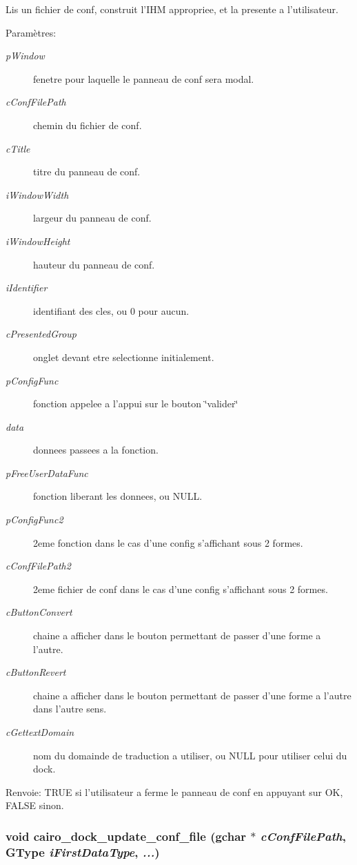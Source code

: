Lis un fichier de conf, construit l'IHM appropriee, et la presente a l'utilisateur. \begin{Desc}
\item[Paramètres:]
\begin{description}
\item[{\em pWindow}]fenetre pour laquelle le panneau de conf sera modal. \item[{\em cConfFilePath}]chemin du fichier de conf. \item[{\em cTitle}]titre du panneau de conf. \item[{\em iWindowWidth}]largeur du panneau de conf. \item[{\em iWindowHeight}]hauteur du panneau de conf. \item[{\em iIdentifier}]identifiant des cles, ou 0 pour aucun. \item[{\em cPresentedGroup}]onglet devant etre selectionne initialement. \item[{\em pConfigFunc}]fonction appelee a l'appui sur le bouton \char`\"{}valider\char`\"{} \item[{\em data}]donnees passees a la fonction. \item[{\em pFreeUserDataFunc}]fonction liberant les donnees, ou NULL. \item[{\em pConfigFunc2}]2eme fonction dans le cas d'une config s'affichant sous 2 formes. \item[{\em cConfFilePath2}]2eme fichier de conf dans le cas d'une config s'affichant sous 2 formes. \item[{\em cButtonConvert}]chaine a afficher dans le bouton permettant de passer d'une forme a l'autre. \item[{\em cButtonRevert}]chaine a afficher dans le bouton permettant de passer d'une forme a l'autre dans l'autre sens. \item[{\em cGettextDomain}]nom du domainde de traduction a utiliser, ou NULL pour utiliser celui du dock. \end{description}
\end{Desc}
\begin{Desc}
\item[Renvoie:]TRUE si l'utilisateur a ferme le panneau de conf en appuyant sur OK, FALSE sinon. \end{Desc}
\subsubsection{\setlength{\rightskip}{0pt plus 5cm}void cairo\_\-dock\_\-update\_\-conf\_\-file (gchar $\ast$ {\em cConfFilePath}, GType {\em iFirstDataType},  {\em ...})}\label{cairo-dock-config_8h_aa96248a38e7aac5b9df7ce355cc0f59}


